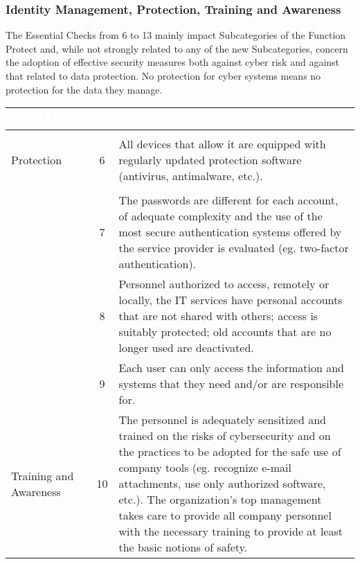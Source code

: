 \subsubsection{Identity Management, Protection, Training and Awareness}
The Essential Checks from 6 to 13 mainly impact Subcategories of the Function Protect and, while not strongly related to any of the new Subcategories, concern the adoption of effective security measures both against cyber risk and against that related to data protection. No protection for cyber systems means no protection for the data they manage.
\begin{table}[H]
\begin{tabularx}{\textwidth}{|>{\centering\arraybackslash}p{}|c|X|} 
\hline
{\cellcolor{dummy-cyan}}\textbf{\textcolor{white}{THEMATIC}} &
\multicolumn{2}{|c|}{{\cellcolor{dummy-cyan}}\textbf{\textcolor{white}{ESSENTIAL CYBERSECURITY CHECKS}}}\\ 
\hline
\begin{tabular}[c]{@{}c@{}}Malware\\Protection\end{tabular} & 6 & {All devices that allow it are equipped with regularly updated protection software (antivirus, antimalware, etc.).}\\ 
\hline
\multirow{7}{*}{\begin{tabular}[c]{@{}c@{}}{Password and}\\{account Management}\end{tabular}} & 7 & {The passwords are different for each account, of adequate complexity and the use of the most secure authentication systems offered by the service provider is evaluated (eg. two-factor authentication).}\\ 
\cline{2-3} & 8 & {Personnel authorized to access, remotely or locally, the IT services have personal accounts that are not shared with others; access is suitably protected; old accounts that are no longer used are deactivated.}\\ 
\cline{2-3} & 9 & {Each user can only access the information and systems that they need and/or are responsible for.}\\ 
\hline
{Training and Awareness} & 10 & {The personnel is adequately sensitized and trained on the risks of cybersecurity and on the practices to be adopted for the safe use of company tools (eg. recognize e-mail attachments, use only authorized software, etc.). The organization's top management takes care to provide all company personnel with the necessary training to provide at least the basic notions of safety.}\\ 

\end{tabularx}
\end{table}
